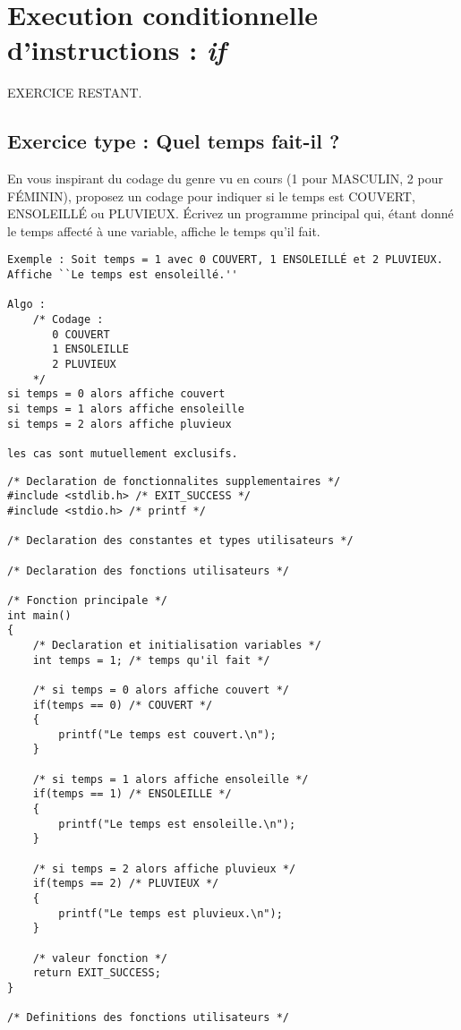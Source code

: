 \section{Execution conditionnelle d'instructions :  \emph{if}}

EXERCICE RESTANT.

\subsection{Exercice type : Quel temps fait-il ?}

En vous inspirant du codage du genre vu en cours (1 pour MASCULIN, 2
pour FÉMININ), proposez un codage pour indiquer si le temps est
COUVERT, ENSOLEILLÉ ou PLUVIEUX.
Écrivez un programme principal qui, étant donné le temps affecté à une
variable, affiche le temps qu'il fait.

\begin{correction}
\begin{verbatim}
Exemple : Soit temps = 1 avec 0 COUVERT, 1 ENSOLEILLÉ et 2 PLUVIEUX.
Affiche ``Le temps est ensoleillé.''

Algo :
    /* Codage :
       0 COUVERT
       1 ENSOLEILLE
       2 PLUVIEUX
    */
si temps = 0 alors affiche couvert
si temps = 1 alors affiche ensoleille
si temps = 2 alors affiche pluvieux 

les cas sont mutuellement exclusifs.
\end{verbatim}
\begin{verbatim}
/* Declaration de fonctionnalites supplementaires */
#include <stdlib.h> /* EXIT_SUCCESS */
#include <stdio.h> /* printf */

/* Declaration des constantes et types utilisateurs */

/* Declaration des fonctions utilisateurs */

/* Fonction principale */
int main()
{
    /* Declaration et initialisation variables */
    int temps = 1; /* temps qu'il fait */

    /* si temps = 0 alors affiche couvert */ 
    if(temps == 0) /* COUVERT */
    {
        printf("Le temps est couvert.\n");
    }

    /* si temps = 1 alors affiche ensoleille */ 
    if(temps == 1) /* ENSOLEILLE */
    {
        printf("Le temps est ensoleille.\n");
    }

    /* si temps = 2 alors affiche pluvieux */ 
    if(temps == 2) /* PLUVIEUX */
    {
        printf("Le temps est pluvieux.\n");
    }
    
    /* valeur fonction */
    return EXIT_SUCCESS;
}

/* Definitions des fonctions utilisateurs */
\end{verbatim}
\end{correction}


